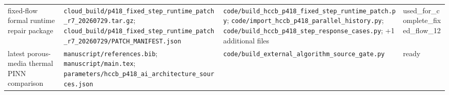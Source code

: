 \begin{longtable}{>{\raggedright\arraybackslash}p{2.8cm}>{\raggedright\arraybackslash}p{6.6cm}>{\raggedright\arraybackslash}p{6.4cm}>{\raggedright\arraybackslash}p{2.4cm}}
fixed-flow formal runtime repair package & \nolinkurl{cloud_build/p418_fixed_step_runtime_patch_r7_20260729.tar.gz}; \nolinkurl{cloud_build/p418_fixed_step_runtime_patch_r7_20260729/PATCH_MANIFEST.json} & \nolinkurl{code/build_hccb_p418_fixed_step_runtime_patch.py}; \nolinkurl{code/import_hccb_p418_parallel_history.py}; \nolinkurl{code/build_hccb_p418_step_response_cases.py}; +1 additional files & used\_\allowbreak{}for\_\allowbreak{}complete\_\allowbreak{}fixed\_\allowbreak{}flow\_\allowbreak{}12 \\
latest porous-media thermal PINN comparison & \nolinkurl{manuscript/references.bib}; \nolinkurl{manuscript/main.tex}; \nolinkurl{parameters/hccb_p418_ai_architecture_sources.json} & \nolinkurl{code/build_external_algorithm_source_gate.py} & ready \\
\end{longtable}
\endgroup
